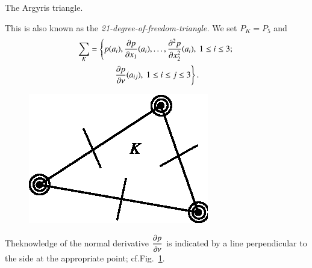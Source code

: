 \begin{example}\label{chap4-exam4.7}
The Argyris triangle.

This is also known as the {\em 21-degree-of-freedom-triangle.} We set
$P_{K}=P_{5}$ and
\begin{gather*}
\sum_{K}=\left\{p(a_{i}),\dfrac{\partial p}{\partial
  x_{1}}(a_{i}),\ldots,\dfrac{\partial^{2}p}{\partial x^{2}_{2}}(a_{i}),\ 1\leq
i\leq 3;\right.\\
\left. \dfrac{\partial p}{\partial \nu}(a_{ij}),\ 1\leq i\leq j\leq 3\right\}.
\end{gather*}
\begin{figure}[H]
\centering
\includegraphics{figure/fig4.7.eps}
\caption{}\label{chap4-fig4.7}
\end{figure}

The\pageoriginale knowledge of the normal derivative $\dfrac{\partial p}{\partial
  \nu}$ is indicated by a line perpendicular to the side at the
appropriate point; cf.\@ Fig.~\ref{chap4-fig4.7}.


\end{example}
